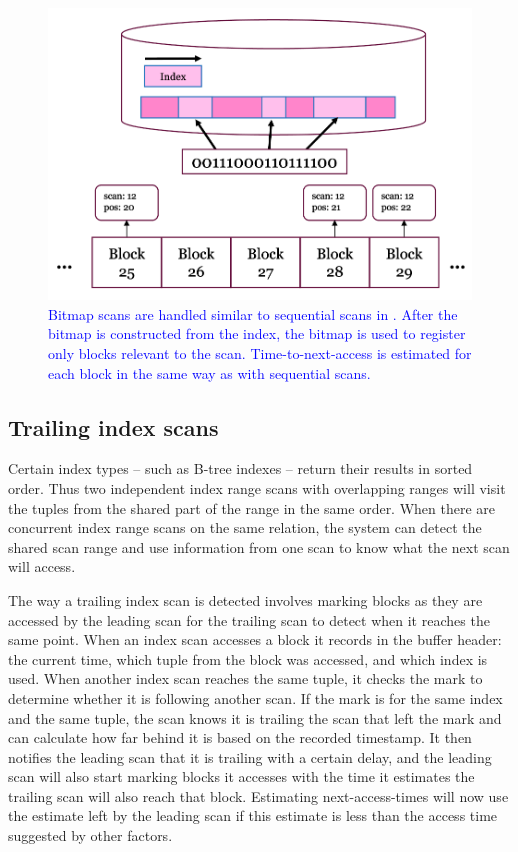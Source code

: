 \begin{figure}
    \centering
    \includegraphics[width=1\columnwidth]{figures/Diagrams/bitmap_scan_registered_progress.png}
    \caption[PBM bitmap scan tracking]{\textcolor{blue}{Bitmap scans are handled similar to sequential scans in . After the bitmap is constructed from the index, the bitmap is used to register only blocks relevant to the scan. Time-to-next-access is estimated for each block in the same way as with sequential scans.}}
    \label{fig:bitmap_scan_tracking}
\end{figure}

\subsection{Trailing index scans}
\label{sec:idx_trailing}

Certain index types -- such as B-tree indexes -- return their results in sorted order. Thus two independent index range scans with overlapping ranges will visit the tuples from the shared part of the range in the same order. When there are concurrent index range scans on the same relation, the system can detect the shared scan range and use information from one scan to know what the next scan will access.

The way a trailing index scan is detected involves marking blocks as they are accessed by the leading scan for the trailing scan to detect when it reaches the same point. When an index scan accesses a block it records in the buffer header: the current time, which tuple from the block was accessed, and which index is used. When another index scan reaches the same tuple, it checks the mark to determine whether it is following another scan. If the mark is for the same index and the same tuple, the scan knows it is trailing the scan that left the mark and can calculate how far behind it is based on the recorded timestamp. It then notifies the leading scan that it is trailing with a certain delay, and the leading scan will also start marking blocks it accesses with the time it estimates the trailing scan will also reach that block. Estimating next-access-times will now use the estimate left by the leading scan if this estimate is less than the access time suggested by other factors.

